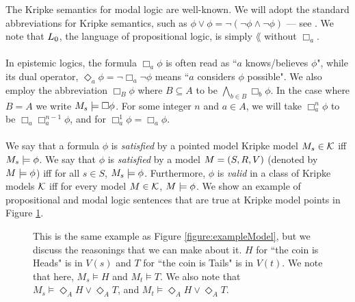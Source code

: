 The Kripke semantics for modal logic are well-known.
We will adopt the standard abbreviations for Kripke semantics, such as $\phi \lor \phi =
\neg(\neg \phi \land \neg \phi)$ --- see \cite{blackburn2002modal}.
We note that $L_0$, the language of propositional logic, is simply $\lang$ without $\Box_a$.\\
\\
In epistemic logics, the formula $\Box_a \phi$ is often read as ``$a$ knows/believes $\phi$", while
its dual operator, $\Diamond_a \phi = \neg \Box_a \neg \phi$ means ``$a$ considers $\phi$ possible".
We also employ the abbreviation $\Box_B \phi$ where $B \subseteq A$ to be $\bigwedge_{b \in B}
\Box_b \phi$.
In the case where $B = A$ we write $M_s \models \Box \phi$.
For some integer $n$ and $a \in A$, we will take $\Box^n_a \phi$ to be $\Box_a \Box^{n-1}_a \phi$,
and for $\Box^1_a \phi = \Box_a \phi$.\\
\\
We say that a formula $\phi$ is {\em satisfied} by a pointed model Kripke model $M_s \in \mathcal{K}$ iff
$M_s \models \phi$.
We say that $\phi$ is {\em satisfied} by a model $M = (S, R, V)$ (denoted by
    $M \models \phi$) iff
for all $s \in S$, $M_s \models \phi$.
Furthermore, $\phi$ is {\em valid} in a class of Kripke models $\mathcal{K}$ iff for
every model $M \in
\mathcal{K}$, $M \models \phi$.
We show an example of propositional and modal logic sentences that are true at Kripke model points in
Figure \ref{figure:exampleReasonings}.

\begin{figure}
\centering
{}
\caption[Example reasonings at each Kripke point]{This is the same example as Figure \ref{figure:exampleModel}, but we discuss the reasonings
that we can make about it.
$H$ for ``the coin is Heads" is in $V(s)$ and $T$ for ``the coin is Tails" is in $V(t)$.
We note that here, $M_s \models H$ and $M_t \models T$.
We also note that $M_s \models \Diamond_A H \lor \Diamond_A T$, and $M_t \models \Diamond_A H \lor
\Diamond_A T$.}
\label{figure:exampleReasonings}
\end{figure}

